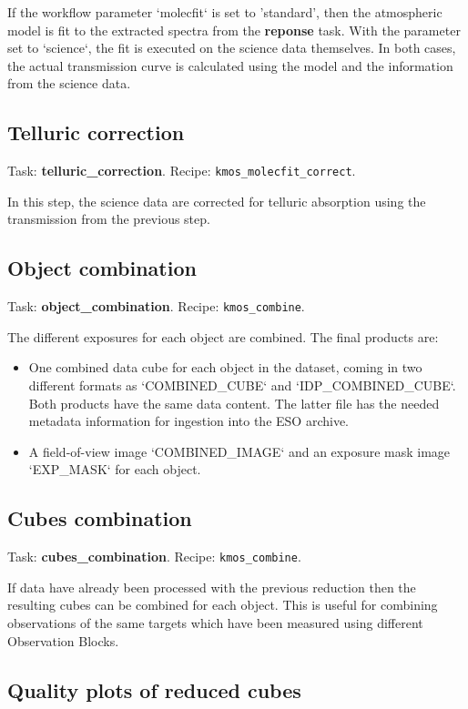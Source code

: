 If the workflow parameter `molecfit` is set to 'standard', then 
the atmospheric model is fit to the extracted spectra from the {\bf reponse} task. 
With the parameter set to `science`, the fit is executed on the science data themselves.
In both cases, the actual transmission curve is calculated using the model and the information from the science data.

\subsection{Telluric correction}

Task: {\bf telluric\_correction}. Recipe: {\tt kmos\_molecfit\_correct}.

In this step, the science data are corrected for telluric absorption using the transmission from the previous step.

\subsection{Object combination}
\label{sec:object_combination}
Task: {\bf object\_combination}. Recipe: {\tt kmos\_combine}.

The different exposures for each object are combined. The final products are:
\begin{itemize}
\item One combined data cube for each object in the dataset, coming in two different formats as
  `COMBINED\_CUBE` and `IDP\_COMBINED\_CUBE`. Both products have the same data content. 
  The latter file has the needed metadata information for ingestion into the ESO archive.
\item A field-of-view image `COMBINED\_IMAGE` and an exposure mask image `EXP\_MASK` for each object.
\end{itemize}


\subsection{Cubes combination}
\label{sec:cubes_combination}
Task: {\bf cubes\_combination}. Recipe: {\tt kmos\_combine}.

If data have already been processed with the previous reduction then the resulting cubes can be combined
for each object. This is useful for combining observations of the same targets which have been measured
using different Observation Blocks.




\subsection{Quality plots of reduced cubes}

